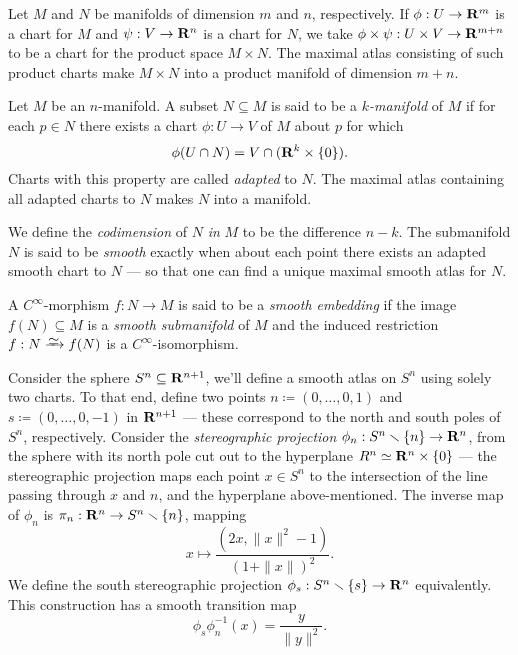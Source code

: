 \begin{definition}
\label{def:product-manifold}
Let \(M\) and \(N\) be manifolds of dimension \(m\) and \(n\), respectively. If
\(\phi: U \to \mathbf{R}^m\) is a chart for \(M\) and \(\psi: V \to \mathbf{R}^n\) is a chart
for \(N\), we take \(\phi \times \psi: U \times V \to \mathbf{R}^{m + n}\) to be a chart
for the product space \(M \times N\). The maximal atlas consisting of such
product charts make \(M \times N\) into a product manifold of dimension
\(m + n\).
\end{definition}

\begin{definition}[Submanifold]
\label{def:submanifold}
Let \(M\) be an \(n\)-manifold. A subset \(N \subseteq M\) is said to be a
\emph{\(k\)-manifold} of \(M\) if for each \(p \in N\) there exists a chart
\(\phi: U \to V\) of \(M\) about \(p\) for which
\[
\phi(U \cap N) = V \cap (\mathbf{R}^k \times \{0\}).
\]
Charts with this property are called \emph{adapted} to \(N\). The maximal atlas
containing all adapted charts to \(N\) makes \(N\) into a manifold.

We define the \emph{codimension} of \(N\) \emph{in} \(M\) to be the difference
\(n - k\). The submanifold \(N\) is said to be \emph{smooth} exactly when about
each point there exists an adapted smooth chart to \(N\) --- so that one can
find a unique maximal smooth atlas for \(N\).
\end{definition}

\begin{definition}
\label{def:smooth-embedding}
A \(C^{\infty}\)-morphism \(f: N \to M\) is said to be a \emph{smooth embedding}
if the image \(f(N) \subseteq M\) is a \emph{smooth submanifold} of \(M\) and
the induced restriction \(f: N \isoto f(N)\) is a \(C^{\infty}\)-isomorphism.
\end{definition}

\begin{example}[Sphere]
\label{exp:sphere-smooth-manifold}
Consider the sphere \(S^n \subseteq \mathbf{R}^{n+1}\), we'll define a smooth atlas on
\(S^n\) using solely two charts. To that end, define two points
\(n \coloneq (0, \dots, 0, 1)\) and \(s \coloneq (0, \dots, 0, -1)\) in
\(\mathbf{R}^{n+1}\) --- these correspond to the north and south poles of \(S^n\),
respectively. Consider the \emph{stereographic projection}
\(\phi_n: S^n \smallsetminus \{n\} \to \mathbf{R}^n\), from the sphere with its north pole
cut out to the hyperplane \(R^n \simeq \mathbf{R}^n \times \{0\}\) --- the stereographic
projection maps each point \(x \in S^n\) to the intersection of the line passing
through \(x\) and \(n\), and the hyperplane above-mentioned. The inverse map of
\(\phi_n\) is \(\pi_n: \mathbf{R}^n \to S^n \smallsetminus \{n\}\), mapping
\[
x \longmapsto \frac{(2 x, \| x \|^2 - 1)}{(1 + \| x \|)^2}.
\]
We define the south stereographic projection \(\phi_s: S^n \smallsetminus \{s\} \to
\mathbf{R}^n\) equivalently. This construction has a smooth transition map
\[
\phi_s \phi_n^{-1}(x) = \frac{y}{\| y \|^2}.
\]
\end{example}


